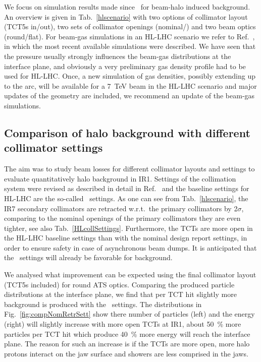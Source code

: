 We focus on simulation results made since~\cite{kweeIpac14} for beam-halo induced background. An overview is given in Tab.~\ref{hlscenario} with two options of collimator layout (TCT5s in/out), two sets of collimator openings (nominal/\twosigmaret) and two beam optics (round/flat). For beam-gas simulations in an HL-LHC scenario we refer to Ref.~\cite{kweeIpac14}, in which the most recent available simulations were described. We have seen that the pressure usually strongly influences the beam-gas distributions at the interface plane, and obviously a very preliminary gas density profile had to be used for HL-LHC. Once, a new simulation of gas densities, possibly extending up to the arc, will be available for a 7~TeV beam in the HL-LHC scenario and major updates of the geometry are included, we recommend an update of the beam-gas simulations. 

\subsection{Comparison of halo background with different collimator settings}

The aim was to study beam losses for different collimator layouts and settings to evaluate quantitatively halo background in IR1. Settings of the collimation system were revised as described in detail in Ref.~\cite{collSettRef} and the baseline settings for HL-LHC are the so-called \twosigmaret~settings. As one can see from Tab.~\ref{hlscenario}, the IR7 secondary collimators are retracted w.r.t.~the primary collimators by 2$\sigma$, comparing to the nominal openings of the primary collimators they are even tighter, see also Tab.~\ref{HLcollSettings}. Furthermore, the TCTs are more open in the HL-LHC baseline settings than with the nominal design report settings, in order to ensure safety in case of asynchronous beam dumps. It is anticipated that the \twosigmaret~settings will already be favorable for background.

We analysed what improvement can be expected using the final collimator layout (TCT5s included) for round ATS optics. Comparing the produced particle distributions at the interface plane, we find that per TCT hit slightly more background is produced with the \twosigmaret~settings. The distributions in Fig.~\ref{fig:compNomRetrSett} show there number of particles (left) and the energy (right) will slightly increase with more open TCTs at IR1, about 50~\% more particles per TCT hit which produce 40~\% more energy will reach the interface plane. The reason for such an increase is if the TCTs are more open, more halo protons interact on the jaw surface and showers are less comprised in the jaws. %

